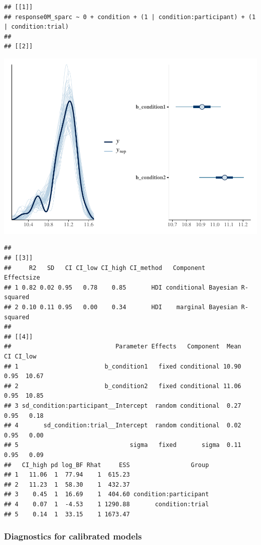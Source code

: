 \documentclass[
]{article}
\begin{document}
\begin{verbatim}
## [[1]]
## response0M_sparc ~ 0 + condition + (1 | condition:participant) + (1 | condition:trial) 
## 
## [[2]]
\end{verbatim}

\includegraphics{06_Publish_GUSO_ASIL_files/figure-latex/Diagnostiics0M-2.pdf}

\begin{verbatim}
## 
## [[3]]
##     R2   SD   CI CI_low CI_high CI_method   Component         Effectsize
## 1 0.82 0.02 0.95   0.78    0.85       HDI conditional Bayesian R-squared
## 2 0.10 0.11 0.95   0.00    0.34       HDI    marginal Bayesian R-squared
## 
## [[4]]
##                             Parameter Effects   Component  Mean   CI CI_low
## 1                        b_condition1   fixed conditional 10.90 0.95  10.67
## 2                        b_condition2   fixed conditional 11.06 0.95  10.85
## 3 sd_condition:participant__Intercept  random conditional  0.27 0.95   0.18
## 4       sd_condition:trial__Intercept  random conditional  0.02 0.95   0.00
## 5                               sigma   fixed       sigma  0.11 0.95   0.09
##   CI_high pd log_BF Rhat     ESS                 Group
## 1   11.06  1  77.94    1  615.23                      
## 2   11.23  1  58.30    1  432.37                      
## 3    0.45  1  16.69    1  404.60 condition:participant
## 4    0.07  1  -4.53    1 1290.88       condition:trial
## 5    0.14  1  33.15    1 1673.47
\end{verbatim}

\hypertarget{diagnostics-for-calibrated-models}{%
\subsubsection{Diagnostics for calibrated
models}\label{diagnostics-for-calibrated-models}}
\end{document}
